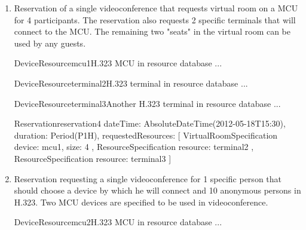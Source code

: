 \begin{enumerate}
\begin{EntityExample}{Reservation}{reservation3}{}
dateTime: AbsoluteDateTime(2012-05-18T15:30), duration: Period(P1H),
requestedPersons: [
  Person { // Martin Srom (must choose a device)
    userIdentity: UserIdentity(srom@cesnet.cz)
  },
  Person { // Petr Holub (must choose a device)
    userIdentity: UserIdentity(hopet@cesnet.cz)
  },
  Person { // Jan Ruzicka (must choose a device)
    name: Jan Ruzicka,
    email: janru@cesnet.cz
  }
]
\end{EntityExample}

\item Reservation of a single videoconference that requests virtual room on a MCU for 4 participants. The reservation also requests 2 specific terminals that will connect to the MCU. The remaining two "seats" in the virtual room can be used by any guests.

\begin{EntityExample}{DeviceResource}{mcu1}{H.323 MCU in resource database}
...
\end{EntityExample}

\begin{EntityExample}{DeviceResource}{terminal2}{H.323 terminal in resource database}
...
\end{EntityExample}

\begin{EntityExample}{DeviceResource}{terminal3}{Another H.323 terminal in resource database}
...
\end{EntityExample}

\begin{EntityExample}{Reservation}{reservation4}{}
dateTime: AbsoluteDateTime(2012-05-18T15:30), duration: Period(P1H),
requestedResources: [
  VirtualRoomSpecification {
    device: mcu1,
    size: 4
  },
  ResourceSpecification {
    resource: terminal2
  },
  ResourceSpecification {
    resource: terminal3
  }
]
\end{EntityExample}

\item Reservation requesting a single videoconference for 1 specific person that should choose a device by which he will connect and 10 anonymous persons in H.323. Two MCU devices are specified to be used in videoconference.


\begin{EntityExample}{DeviceResource}{mcu2}{H.323 MCU in resource database}
...
\end{EntityExample}


\end{enumerate}
